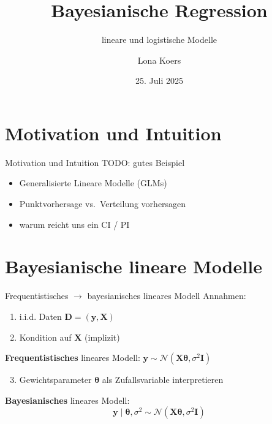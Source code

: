 \documentclass[
  ignorenonframetext,
  aspectratio=169,
]{beamer}
\title{Bayesianische Regression}
\subtitle{lineare und logistische Modelle}
\author{Lona Koers}
\date{25. Juli 2025}
\institute{LMU}
\providecommand{\tightlist}{%
  \setlength{\itemsep}{0pt}\setlength{\parskip}{0pt}}
\newcommand{\by}{\bm{y}}
\newcommand{\bD}{\bm{D}}
\newcommand{\bI}{\bm{I}}
\newcommand{\bX}{\bm{X}}
\newcommand{\Ncal}{\mathcal{N}}
\newcommand{\ssd}{\sigma^2}
\newcommand{\btheta}{\bm{\theta}}
\begin{document}
\frame{\titlepage}

\section{Motivation und Intuition}\label{motivation-und-intuition}

\begin{frame}{Motivation und Intuition}
TODO: gutes Beispiel

\begin{itemize}
\item
  Generalisierte Lineare Modelle (GLMs)
\item
  Punktvorhersage vs.~Verteilung vorhersagen
\item
  warum reicht uns ein CI / PI
\end{itemize}
\end{frame}

\section{Bayesianische lineare
Modelle}\label{bayesianische-lineare-modelle}

\begin{frame}{Frequentistisches \(\to\) bayesianisches lineares Modell}
\protect{}\label{frequentistisches-to-bayesianisches-lineares-modell}
Annahmen:

\begin{enumerate}
\tightlist
\item
  i.i.d. Daten \(\bD = (\by, \bX)\)
\item
  Kondition auf \(\bX\) (implizit)
\end{enumerate}

\textbf{Frequentistisches} lineares Modell:
\(\by \sim \Ncal(\bX \btheta, \ssd \bI)\)

\begin{enumerate}
\setcounter{enumi}{2}
\tightlist
\item
  Gewichtsparameter \(\btheta\) als Zufallsvariable interpretieren
\end{enumerate}

\begin{block}{\textbf{Bayesianisches} lineares Modell:}
\protect{}\label{bayesianisches-lineares-modell}
\[\by \mid \btheta, \ssd \sim \Ncal(\bX \btheta, \ssd \bI)\]
\end{block}
\end{frame}
\end{document}
